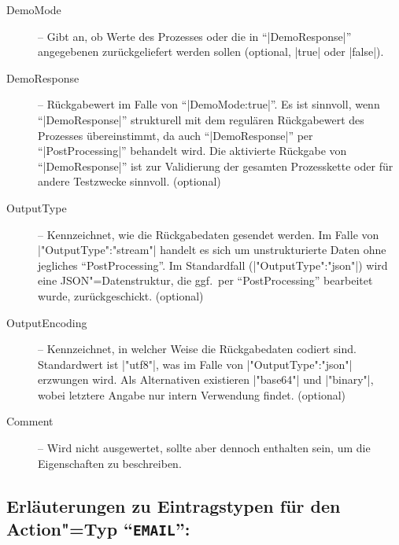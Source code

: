 \documentclass[%
fontsize=11pt
,paper=a4
,twoside
,headings=normal
,pagesize
]{scrartcl}
\begin{document}
\begin{description}
  \item[DemoMode] -- Gibt an, ob Werte des Prozesses oder die in
  "`|DemoResponse|"' angegebenen zurückgeliefert werden sollen
  (optional, |true| oder |false|).

  \item[DemoResponse] -- Rückgabewert im Falle von
  "`|DemoMode:true|"'. Es ist sinnvoll, wenn "`|DemoResponse|"'
  strukturell mit dem regulären Rückgabewert des Prozesses
  übereinstimmt, da auch "`|DemoResponse|"' per "`|PostProcessing|"'
  behandelt wird. Die aktivierte Rückgabe von "`|DemoResponse|"' ist
  zur Validierung der gesamten Prozesskette oder für andere
  Testzwecke sinnvoll. (optional)

  \item[OutputType] -- Kennzeichnet, wie die Rückgabedaten gesendet
  werden. Im Falle von |"OutputType":"stream"| handelt es sich um
  unstrukturierte Daten ohne jegliches "`PostProcessing"'. Im
  Standardfall (|"OutputType":"json"|) wird eine
  JSON"=Datenstruktur, die ggf.\ per "`PostProcessing"' bearbeitet
  wurde, zurückgeschickt. (optional)

  \item[OutputEncoding] -- Kennzeichnet, in welcher Weise die
  Rückgabedaten codiert sind. Standardwert ist |"utf8"|, was im
  Falle von |"OutputType":"json"| erzwungen wird. Als Alternativen
  existieren |"base64"| und |"binary"|, wobei letztere Angabe nur
  intern Verwendung findet. (optional)

  \item[Comment] -- Wird nicht ausgewertet, sollte aber dennoch
  enthalten sein, um die Eigenschaften zu beschreiben.

\end{description}

\subsection*{Erläuterungen zu Eintragstypen für den Action"=Typ
"`\texttt{EMAIL}"':}
\end{document}
